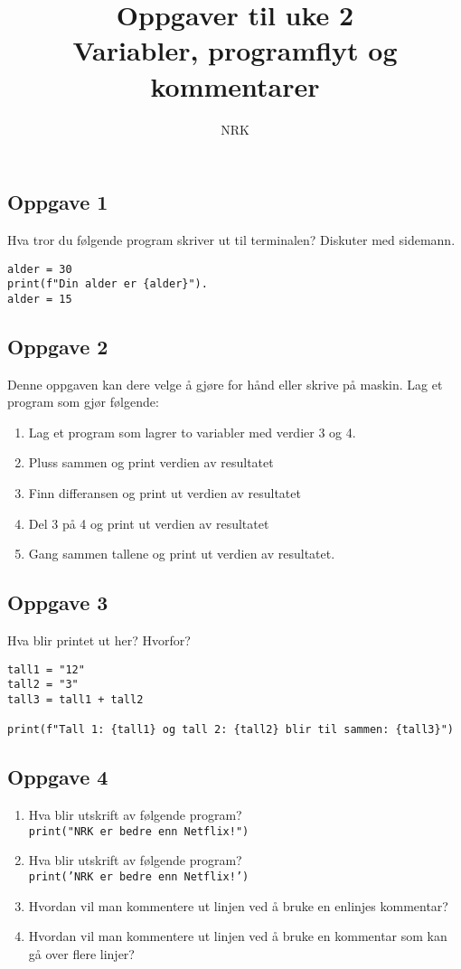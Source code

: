 \documentclass{article}
\title{Oppgaver til uke 2 \\ Variabler, programflyt og kommentarer}
\author{NRK}
\date{}
\begin{document}
\maketitle
\noindent
\subsection*{Oppgave 1}
Hva tror du følgende program skriver ut til terminalen? Diskuter med sidemann.

\begin{verbatim}
alder = 30
print(f"Din alder er {alder}").
alder = 15
\end{verbatim} 


\subsection*{Oppgave 2}
Denne oppgaven kan dere velge å gjøre for hånd eller skrive på maskin. Lag et program som gjør følgende:
\begin{enumerate}
    \item Lag et program som lagrer to variabler med verdier 3 og 4.
    \item Pluss sammen og print verdien av resultatet
    \item Finn differansen og print ut verdien av resultatet
    \item Del 3 på 4 og print ut verdien av resultatet
    \item Gang sammen tallene og print ut verdien av resultatet.
\end{enumerate}

\subsection*{Oppgave 3}
Hva blir printet ut her? Hvorfor?
\begin{verbatim}
tall1 = "12"
tall2 = "3"
tall3 = tall1 + tall2

print(f"Tall 1: {tall1} og tall 2: {tall2} blir til sammen: {tall3}")
\end{verbatim}

\subsection*{Oppgave 4}
\begin{enumerate}
    \item Hva blir utskrift av følgende program? \\
    \texttt{print("NRK er bedre enn Netflix!")}
    \item Hva blir utskrift av følgende program? \\
    \texttt{print('NRK er bedre enn Netflix!')}
    \item Hvordan vil man kommentere ut linjen ved å bruke en enlinjes kommentar?
    \item Hvordan vil man kommentere ut linjen ved å bruke en kommentar som kan gå over flere linjer?
\end{enumerate}
\end{document}
